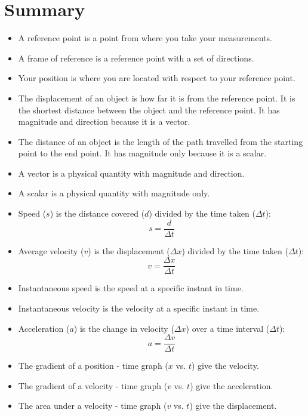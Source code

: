 \section{Summary}
\begin{itemize}
\item A reference point is a point from where you take your measurements.
\item A frame of reference is a reference point with a set of directions.
\item Your position is where you are located with respect to your reference point.
\item The displacement of an object is how far it is from the reference point. It is the shortest distance between the object and the reference point. It has magnitude and direction because it is a vector.
\item The distance of an object is the length of the path travelled from the starting point to the end point. It has magnitude only because it is a scalar.
\item A vector is a physical quantity with magnitude and direction.
\item A scalar is a physical quantity with magnitude only.
\item {Speed ($s$) is the distance covered ($d$) divided by the time taken ($\Delta t$): 
\begin{equation*}
s=\frac{d}{\Delta t}
\end{equation*}}
\item {Average velocity ($v$) is the displacement ($\Delta x$) divided by the time taken ($\Delta t$):
\begin{equation*}
v=\frac{\Delta x}{\Delta t}
\end{equation*}}
\item Instantaneous speed is the speed at a specific instant in time.
\item Instantaneous velocity is the velocity at a specific instant in time.
\item {Acceleration ($a$) is the change in velocity ($\Delta x$) over a time interval ($\Delta t$):
\begin{equation*}
a=\frac{\Delta v}{\Delta t}
\end{equation*}}
\item The gradient of a position - time graph ($x$ vs. $t$) give the velocity.
\item The gradient of a velocity - time graph ($v$ vs. $t$) give the acceleration.
\item The area under a velocity - time graph ($v$ vs. $t$) give the displacement.

\end{itemize}

